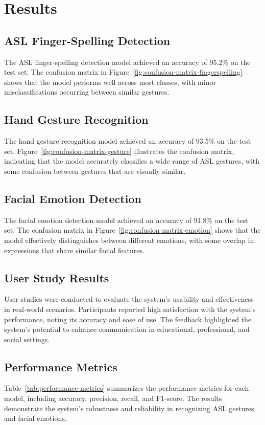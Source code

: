 \documentclass{article}
\begin{document}
\section{Results}
\subsection{ASL Finger-Spelling Detection}
The ASL finger-spelling detection model achieved an accuracy of 95.2\% on the test set. The confusion matrix in Figure~\ref{fig:confusion-matrix-fingerspelling} shows that the model performs well across most classes, with minor misclassifications occurring between similar gestures.


\subsection{Hand Gesture Recognition}
The hand gesture recognition model achieved an accuracy of 93.5\% on the test set. Figure~\ref{fig:confusion-matrix-gesture} illustrates the confusion matrix, indicating that the model accurately classifies a wide range of ASL gestures, with some confusion between gestures that are visually similar.


\subsection{Facial Emotion Detection}
The facial emotion detection model achieved an accuracy of 91.8\% on the test set. The confusion matrix in Figure~\ref{fig:confusion-matrix-emotion} shows that the model effectively distinguishes between different emotions, with some overlap in expressions that share similar facial features.


\subsection{User Study Results}
User studies were conducted to evaluate the system's usability and effectiveness in real-world scenarios. Participants reported high satisfaction with the system's performance, noting its accuracy and ease of use. The feedback highlighted the system's potential to enhance communication in educational, professional, and social settings.

\subsection{Performance Metrics}
Table~\ref{tab:performance-metrics} summarizes the performance metrics for each model, including accuracy, precision, recall, and F1-score. The results demonstrate the system's robustness and reliability in recognizing ASL gestures and facial emotions.
\end{document}
